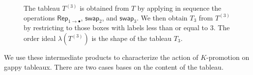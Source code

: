 \documentclass[12pt]{amsart}
\theoremstyle{definition}
\theoremstyle{remark}
\numberwithin{equation}{section}
\newcommand{\swap}{\ensuremath{\mathsf{swap}}}
\newcommand{\rep}{\ensuremath{\mathsf{Rep}}}
\begin{document}
  
\begin{figure}[h]
\caption{The tableau $T^{(3)}$ is obtained from $T$ by applying in sequence the operations 
$\rep_{1 \rightarrow \bullet}$, $\swap_2$, and $\swap_3$. 
We then obtain $T_3$ from $T^{(3)}$ by restricting to 
those boxes with labels less than or equal to $3$. The order ideal
 $\lambda \left( T^{(3)} \right)$ is the 
shape of the tableau $T_3$. }\label{fig:restricted_promotions}
\end{figure}

We use these intermediate products to characterize the action of $K$-promotion on gappy tableaux. There are two cases bases on the content of the tableau. 
\end{document}
